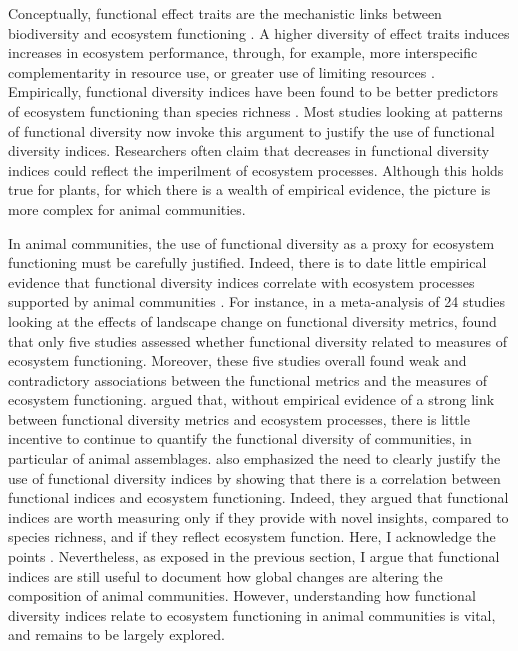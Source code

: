 Conceptually, functional effect traits are the mechanistic links between biodiversity and ecosystem functioning \citep{Lavorel2002,Violle2007}. A higher diversity of effect traits induces increases in ecosystem performance, through, for example, more interspecific complementarity in resource use, or greater use of limiting resources \citep{Tilman2014}. Empirically, functional diversity indices have been found to be better predictors of ecosystem functioning than species richness \citep{Cadotte2011, Flynn2011, Abonyi2018}. Most studies looking at patterns of functional diversity now invoke this argument to justify the use of functional diversity indices. Researchers often claim that decreases in functional diversity indices could reflect the imperilment of ecosystem processes. Although this holds true for plants, for which there is a wealth of empirical evidence, the picture is more complex for animal communities. 

In animal communities, the use of functional diversity as a proxy for ecosystem functioning must be carefully justified. Indeed, there is to date little empirical evidence that functional diversity indices correlate with ecosystem processes supported by animal communities \citep{Hatfield2018, Didham2016}. For instance, in a meta-analysis of 24 studies looking at the effects of landscape change on functional diversity metrics, \citet{Hatfield2018} found that only five studies assessed whether functional diversity related to measures of ecosystem functioning. Moreover, these five studies overall found weak and contradictory associations between the functional metrics and the measures of ecosystem functioning. \citet{Hatfield2018} argued that, without empirical evidence of a strong link between functional diversity metrics and ecosystem processes, there is little incentive to continue to quantify the functional diversity of communities, in particular of animal assemblages.  \citet{Cadotte2011} also emphasized the need to clearly justify the use of functional diversity indices by showing that there is a correlation between functional indices and ecosystem functioning. Indeed, they argued that functional indices are worth measuring only if they provide with novel insights, compared to species richness, and if they reflect ecosystem function. Here, I acknowledge the points \citet{Hatfield2018, Cadotte2011}. Nevertheless, as exposed in the previous section, I argue that functional indices are still useful to document how global changes are altering the composition of animal communities. However, understanding how functional diversity indices relate to ecosystem functioning in animal communities is vital, and remains to be largely explored.

